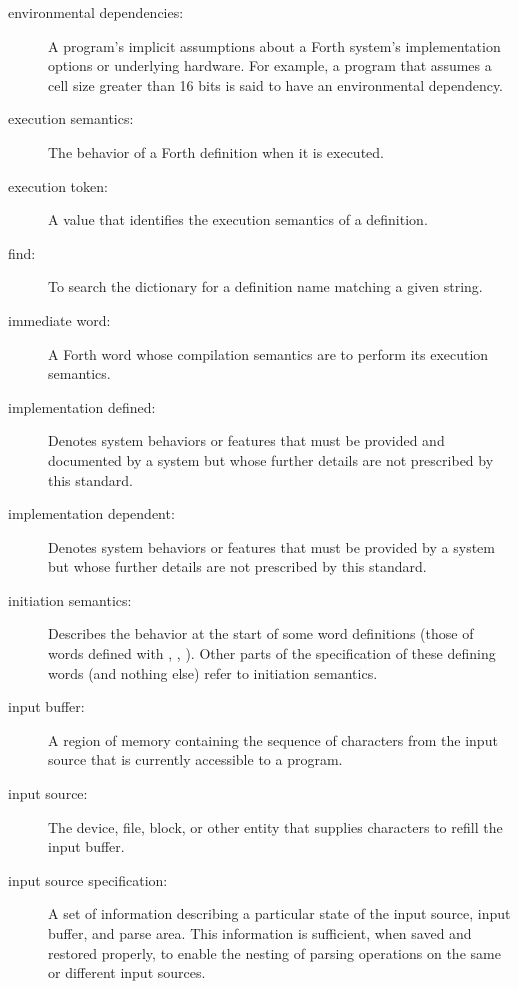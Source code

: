 \begin{description}
\item[environmental dependencies:]
	A program's implicit assumptions about a Forth system's
	implementation options or underlying hardware. For example,
	a program that assumes a cell size greater than 16 bits is
	said to have an environmental dependency.

\item[execution semantics:]
	The behavior of a Forth definition when it is executed.

\item[execution token:]
	A value that identifies the execution semantics of a definition.

\item[find:]
	To search the dictionary for a definition name matching a given
	string. \\
	
\item[immediate word:]
	A Forth word whose compilation semantics are to perform its
	execution semantics.

\item[implementation defined:]
	Denotes system behaviors or features that must be provided and
	documented by a system but whose further details are not prescribed
	by this standard.

\item[implementation dependent:]
	Denotes system behaviors or features that must be provided by a
	system but whose further details are not prescribed by this standard.

\item[initiation semantics:]
	Describes the behavior at the start of some word definitions (those
	of words defined with \word{:}, , 
	).  Other parts of the specification of these defining
	words (and nothing else) refer to initiation semantics.

\item[input buffer:]
	A region of memory containing the sequence of characters from the
	input source that is currently accessible to a program.

\item[input source:]
	The device, file, block, or other entity that supplies characters
	to refill the input buffer.

\item[input source specification:]
	A set of information describing a particular state of the input
	source, input buffer, and parse area. This information is
	sufficient, when saved and restored properly, to enable the nesting
	of parsing operations on the same or different input sources.


\end{description}
